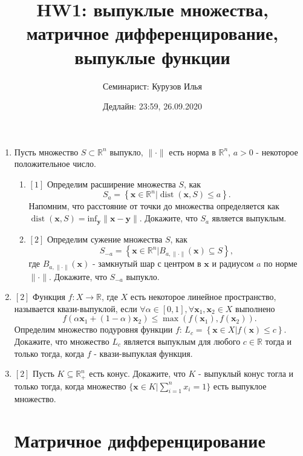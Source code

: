 \documentclass{article}
\title{HW1: выпуклые множества, матричное дифференцирование, выпуклые функции}
\author{Семинарист: Курузов Илья}
\date{Дедлайн: 23:59, 26.09.2020}
\DeclareMathOperator{\dist}{dist}
\begin{document}
\maketitle

\begin{enumerate}
\section{Выпуклые множества}

    \item Пусть множество $S\subset \mathbb{R}^n$ выпукло, $\|\cdot\|$ есть норма в $\mathbb{R}^n$, $a > 0$ - некоторое положительное число.
    \begin{enumerate}[label=\alph*)]
        \item $[1]$ Определим расширение множества $S$, как $$S_a = \left\{\textbf{x}\in \mathbb{R}^n\Big| \dist(\textbf{x},S)\leq a \right\}.$$ Напомним, что расстояние от точки до множества определяется как $\dist(\textbf{x}, S)=\text{inf}_\mathbf{y}\|\mathbf{x}-\mathbf{y}\|$. Докажите, что $S_a$ является выпуклым.
        \item $[2]$ Определим сужение множества $S$, как $$S_{-a}=\left\{\textbf{x}\in \mathbb{R}^n\Big| B_{a,\|\cdot\|}(\textbf{x}) \subseteq S\right\},$$
        где $B_{a,\|\cdot\|}(\textbf{x})$ - замкнутый шар с центром в $\textbf{x}$ и радиусом $a$ по норме $\|\cdot\|$. Докажите, что $S_{-a}$ выпукло.
    \end{enumerate}
    
    \item $[2]$ Функция $f:X\rightarrow \mathbb{R}$, где $X$ есть некоторое линейное пространство, называется квази-выпуклой, если $\forall \alpha\in[0,1], \forall \mathbf{x}_1,\mathbf{x}_2\in X$ выполнено $$f(\alpha\mathbf{x}_1+(1-\alpha)\mathbf{x}_2)\leq \max(f(\mathbf{x}_1),f(\mathbf{x}_2)).$$
    Определим множество подуровня функции $f$: $L_c=\left\{\mathbf{x}\in X \Big| f(\mathbf{x})\leq c\right\}$. Докажите, что множество $L_c$ является выпуклым для любого $c\in\mathbb{R}$ тогда и только тогда, когда $f$ - квази-выпуклая функция.
    
    \item $[2]$ Пусть $K\subseteq \mathbb{R}^n_+$ есть конус. Докажите, что $K$ - выпуклый конус тогла и только тогда, когда множество $\{\mathbf{x}\in K | \sum\limits_{i=1}^n x_i=1\}$ есть выпуклое множество.


    
\section{Матричное дифференцирование}


\end{enumerate}
\end{document}
